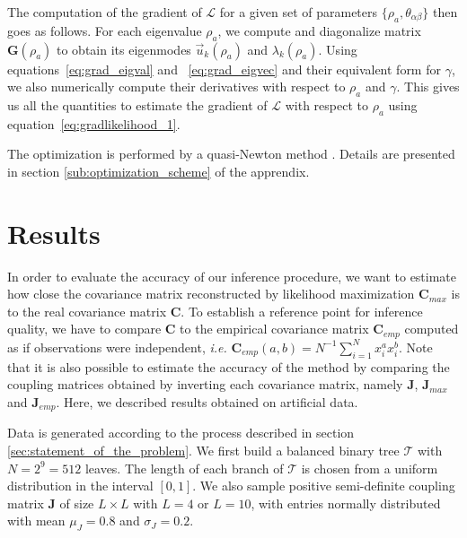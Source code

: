 \documentclass[preprint,amsmath,amssymb,superscriptaddress,showpacs,pre]{revtex4-1}
\begin{document}
The computation of the gradient of $\mathcal{L}$ for a given set of parameters $\{\rho_a, \theta_{\alpha\beta}\}$ then goes as follows. 
For each eigenvalue $\rho_a$, we compute and diagonalize matrix $\bm{G}(\rho_a)$ to obtain its eigenmodes $\vec{u}_k(\rho_a)$ and $\lambda_k(\rho_a)$. 
Using equations~\eqref{eq:grad_eigval} and ~\eqref{eq:grad_eigvec} and their equivalent form for $\gamma$, we also numerically compute their derivatives with respect to $\rho_a$ and $\gamma$. 
This gives us all the quantities to estimate the gradient of $\mathcal{L}$ with respect to $\rho_a$ using equation~\eqref{eq:gradlikelihood_1}.

 The optimization is performed by a quasi-Newton method \cite{NLopt}. Details are presented in section \ref{sub:optimization_scheme} of the apprendix. 




\section{Results}
\label{sec:Results}

In order to evaluate the accuracy of our inference procedure, we want to estimate how close the covariance matrix reconstructed by likelihood maximization $\bm{C}_{max}$ is to the real covariance matrix $\bm{C}$. 
To establish  a reference point for inference quality, we have to compare $\bm{C}$ to the empirical covariance matrix $\bm{C}_{emp}$ computed as if observations were independent, \emph{i.e.} $\bm{C}_{emp}(a,b) = N^{-1}\sum_{i=1}^N x_i^a x_i^b$. 
Note that it is also possible to estimate the accuracy of the method by comparing the coupling matrices obtained by inverting each covariance matrix, namely $\bm{J}$, $\bm{J}_{max}$ and $\bm{J}_{emp}$. 
Here, we described results obtained on artificial data. 


Data is generated according to the process described in section \ref{sec:statement_of_the_problem}. 
We first build a  balanced binary tree $\mathcal{T}$ with $N=2^9=512$ leaves. 
The length of each branch of $\mathcal{T}$ is chosen from a uniform distribution in the interval $[0,1]$. 
We also sample positive semi-definite coupling matrix $\bm{J}$ of size $L\times L$ with $L=4$ or $L=10$, with entries normally distributed with mean $\mu_J=0.8$ and $\sigma_J=0.2$. 
\end{document}
